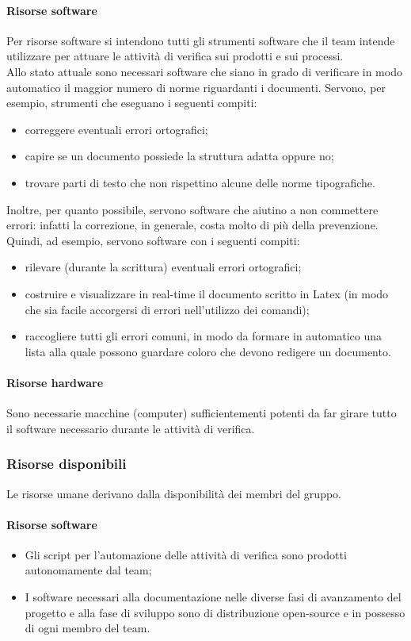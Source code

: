 				\paragraph{Risorse software}
					Per risorse software si intendono tutti gli strumenti software che il team intende utilizzare per attuare le attività di verifica sui 
					prodotti e sui processi.\\
					Allo stato attuale sono necessari software che siano in grado di verificare in modo automatico il maggior numero di norme riguardanti 
					i documenti. Servono, per esempio, strumenti che eseguano i seguenti compiti:
					\begin{itemize}
						\item correggere eventuali errori ortografici;
						\item capire se un documento possiede la struttura adatta oppure no;
						\item trovare parti di testo che non rispettino alcune delle norme tipografiche.
					\end{itemize}
					Inoltre, per quanto possibile, servono software che aiutino a non commettere errori: infatti la correzione, in generale, costa 
					molto di più della prevenzione. Quindi, ad esempio, servono software con i seguenti compiti:
					\begin{itemize}
						\item rilevare (durante la scrittura) eventuali errori ortografici;
						\item costruire e visualizzare in real-time il documento scritto in Latex (in modo che sia facile accorgersi di errori 
						nell'utilizzo dei comandi);
						\item raccogliere tutti gli errori comuni, in modo da formare in automatico una lista alla quale possono guardare coloro che 
						devono redigere un documento. 
					\end{itemize}
				\paragraph{Risorse hardware}
					Sono necessarie macchine (computer) sufficientementi potenti da far girare tutto il software necessario durante le attività di verifica.
		\subsubsection{Risorse disponibili}
		Le risorse umane derivano dalla disponibilità dei membri del gruppo.
		\paragraph{Risorse software}
			\begin{itemize}
				\item Gli script per l'automazione delle attività di verifica sono prodotti autonomamente dal team;
				\item I software necessari alla documentazione nelle diverse fasi di avanzamento  del progetto e alla fase di sviluppo sono di distribuzione open-source e in possesso di ogni membro del team.
			\end{itemize}
